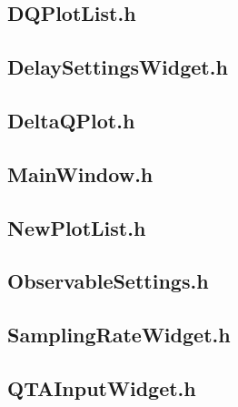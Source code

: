 \subsection{DQPlotList.h}


\subsection{DelaySettingsWidget.h}


\subsection{DeltaQPlot.h}


\subsection{MainWindow.h}


\subsection{NewPlotList.h}


\subsection{ObservableSettings.h}


\subsection{SamplingRateWidget.h}


\subsection{QTAInputWidget.h}


